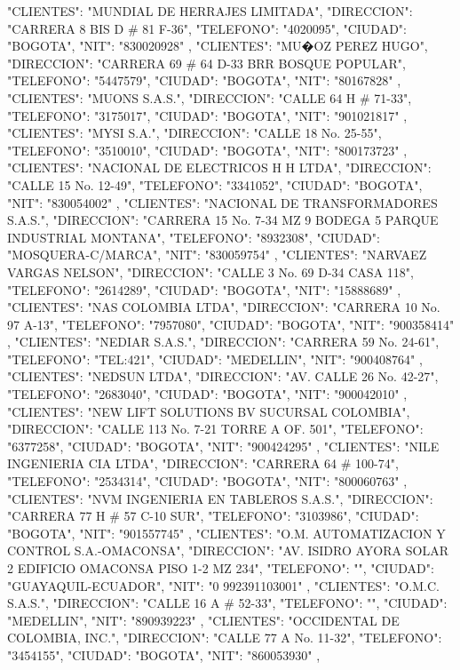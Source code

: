    {
   "CLIENTES": "MUNDIAL DE HERRAJES LIMITADA",
   "DIRECCION": "CARRERA 8 BIS D # 81 F-36",
   "TELEFONO": "4020095",
   "CIUDAD": "BOGOTA",
   "NIT": "830020928"
   },
   {
   "CLIENTES": "MU�OZ PEREZ HUGO",
   "DIRECCION": "CARRERA 69 # 64 D-33 BRR BOSQUE POPULAR",
   "TELEFONO": "5447579",
   "CIUDAD": "BOGOTA",
   "NIT": "80167828"
   },
   {
   "CLIENTES": "MUONS S.A.S.",
   "DIRECCION": "CALLE 64 H # 71-33",
   "TELEFONO": "3175017",
   "CIUDAD": "BOGOTA",
   "NIT": "901021817"
   },
   {
   "CLIENTES": "MYSI S.A.",
   "DIRECCION": "CALLE 18 No. 25-55",
   "TELEFONO": "3510010",
   "CIUDAD": "BOGOTA",
   "NIT": "800173723"
   },
   {
   "CLIENTES": "NACIONAL DE ELECTRICOS H H LTDA",
   "DIRECCION": "CALLE 15 No. 12-49",
   "TELEFONO": "3341052",
   "CIUDAD": "BOGOTA",
   "NIT": "830054002"
   },
   {
   "CLIENTES": "NACIONAL DE TRANSFORMADORES S.A.S.",
   "DIRECCION": "CARRERA 15 No. 7-34 MZ 9 BODEGA 5 PARQUE INDUSTRIAL MONTANA",
   "TELEFONO": "8932308",
   "CIUDAD": "MOSQUERA-C/MARCA",
   "NIT": "830059754"
   },
   {
   "CLIENTES": "NARVAEZ VARGAS NELSON",
   "DIRECCION": "CALLE 3 No. 69 D-34 CASA 118",
   "TELEFONO": "2614289",
   "CIUDAD": "BOGOTA",
   "NIT": "15888689"
   },
   {
   "CLIENTES": "NAS COLOMBIA LTDA",
   "DIRECCION": "CARRERA 10 No. 97 A-13",
   "TELEFONO": "7957080",
   "CIUDAD": "BOGOTA",
   "NIT": "900358414"
   },
   {
   "CLIENTES": "NEDIAR S.A.S.",
   "DIRECCION": "CARRERA 59 No. 24-61",
   "TELEFONO": "TEL:421",
   "CIUDAD": "MEDELLIN",
   "NIT": "900408764"
   },
   {
   "CLIENTES": "NEDSUN LTDA",
   "DIRECCION": "AV. CALLE 26 No. 42-27",
   "TELEFONO": "2683040",
   "CIUDAD": "BOGOTA",
   "NIT": "900042010"
   },
   {
   "CLIENTES": "NEW LIFT SOLUTIONS BV SUCURSAL COLOMBIA",
   "DIRECCION": "CALLE 113 No. 7-21 TORRE A OF. 501",
   "TELEFONO": "6377258",
   "CIUDAD": "BOGOTA",
   "NIT": "900424295"
   },
   {
   "CLIENTES": "NILE INGENIERIA CIA LTDA",
   "DIRECCION": "CARRERA 64 # 100-74",
   "TELEFONO": "2534314",
   "CIUDAD": "BOGOTA",
   "NIT": "800060763"
   },
   {
   "CLIENTES": "NVM INGENIERIA EN TABLEROS S.A.S.",
   "DIRECCION": "CARRERA 77 H # 57 C-10 SUR",
   "TELEFONO": "3103986",
   "CIUDAD": "BOGOTA",
   "NIT": "901557745"
   },
   {
   "CLIENTES": "O.M. AUTOMATIZACION Y CONTROL S.A.-OMACONSA",
   "DIRECCION": "AV. ISIDRO AYORA SOLAR 2 EDIFICIO OMACONSA PISO 1-2 MZ 234",
   "TELEFONO": "",
   "CIUDAD": "GUAYAQUIL-ECUADOR",
   "NIT": "0 992391103001"
   },
   {
   "CLIENTES": "O.M.C. S.A.S.",
   "DIRECCION": "CALLE 16 A # 52-33",
   "TELEFONO": "",
   "CIUDAD": "MEDELLIN",
   "NIT": "890939223"
   },
   {
   "CLIENTES": "OCCIDENTAL DE COLOMBIA, INC.",
   "DIRECCION": "CALLE 77 A No. 11-32",
   "TELEFONO": "3454155",
   "CIUDAD": "BOGOTA",
   "NIT": "860053930"
   },
